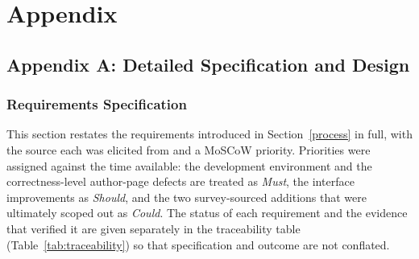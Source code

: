 \section{Appendix}

\subsection{Appendix A: Detailed Specification and Design}

\subsubsection{Requirements Specification}

This section restates the requirements introduced in Section~\ref{process} in full, with the source each was elicited from and a MoSCoW priority. Priorities were assigned against the time available: the development environment and the correctness-level author-page defects are treated as \emph{Must}, the interface improvements as \emph{Should}, and the two survey-sourced additions that were ultimately scoped out as \emph{Could}. The status of each requirement and the evidence that verified it are given separately in the traceability table (Table~\ref{tab:traceability}) so that specification and outcome are not conflated.

